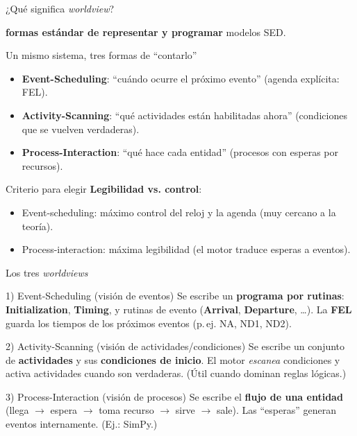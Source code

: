 \documentclass[aspectratio=1610, 9pt]{beamer}
\begin{document}
\begin{frame}{¿Qué significa \textit{worldview}?}
\small

\textbf{formas estándar de representar y programar} modelos SED.

\vspace{4pt}
\begin{block}{Un mismo sistema, tres formas de “contarlo”}
\begin{itemize}
\item \textbf{Event-Scheduling}: “cuándo ocurre el próximo evento” (agenda explícita: FEL).
\item \textbf{Activity-Scanning}: “qué actividades están habilitadas ahora” (condiciones que se vuelven verdaderas).
\item \textbf{Process-Interaction}: “qué hace cada entidad” (procesos con esperas por recursos).
\end{itemize}
\end{block}

\vspace{4pt}
\begin{block}{Criterio para elegir}
\textbf{Legibilidad vs. control}:  
\begin{itemize}
\item Event-scheduling: máximo control del reloj y la agenda (muy cercano a la teoría).
\item Process-interaction: máxima legibilidad (el motor traduce esperas a eventos).
\end{itemize}
\end{block}
\end{frame}

\begin{frame}{Los tres \textit{worldviews} }
\small
\begin{block}{1) Event-Scheduling (visión de eventos)}
Se escribe un \textbf{programa por rutinas}: \textbf{Initialization}, \textbf{Timing}, y rutinas de evento (\textbf{Arrival}, \textbf{Departure}, \dots).  
La \textbf{FEL} guarda los tiempos de los próximos eventos (p.\,ej. NA, ND1, ND2).
\end{block}

\begin{block}{2) Activity-Scanning (visión de actividades/condiciones)}
Se escribe un conjunto de \textbf{actividades} y sus \textbf{condiciones de inicio}.  
El motor \emph{escanea} condiciones y activa actividades cuando son verdaderas. (Útil cuando dominan reglas lógicas.)
\end{block}

\begin{block}{3) Process-Interaction (visión de procesos)}
Se escribe el \textbf{flujo de una entidad} (llega $\to$ espera $\to$ toma recurso $\to$ sirve $\to$ sale).  
Las “esperas” generan eventos internamente. (Ej.: SimPy.)
\end{block}
\end{frame}
\end{document}
